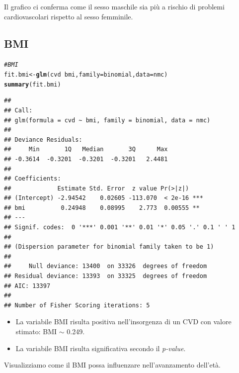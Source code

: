 \documentclass{article}\usepackage[]{graphicx}\usepackage[]{xcolor}
\makeatletter
\newcommand{\hlcom}[1]{\textcolor[rgb]{0.678,0.584,0.686}{\textit{#1}}}%
\newcommand{\hlopt}[1]{\textcolor[rgb]{0,0,0}{#1}}%
\newcommand{\hlstd}[1]{\textcolor[rgb]{0.345,0.345,0.345}{#1}}%
\newcommand{\hlkwb}[1]{\textcolor[rgb]{0.69,0.353,0.396}{#1}}%
\newcommand{\hlkwc}[1]{\textcolor[rgb]{0.333,0.667,0.333}{#1}}%
\newcommand{\hlkwd}[1]{\textcolor[rgb]{0.737,0.353,0.396}{\textbf{#1}}}%
\newenvironment{kframe}{%
 \def\at@end@of@kframe{}%
 \ifinner\ifhmode%
  \def\at@end@of@kframe{\end{minipage}}%
  \begin{minipage}{\columnwidth}%
 \fi\fi%
 \def\FrameCommand##1{\hskip\@totalleftmargin \hskip-\fboxsep
 \colorbox{shadecolor}{##1}\hskip-\fboxsep
     \hskip-\linewidth \hskip-\@totalleftmargin \hskip\columnwidth}%
 \MakeFramed {\advance\hsize-\width
   \@totalleftmargin\z@ \linewidth\hsize
   \@setminipage}}%
 {\par\unskip\endMakeFramed%
 \at@end@of@kframe}
\newenvironment{knitrout}{}{} %
\makeatother
\begin{document}
    Il grafico ci conferma come il sesso maschile sia più a rischio di problemi
    cardiovascolari rispetto al sesso femminile.
  \clearpage
  \subsection{BMI}
\begin{knitrout}
\color{fgcolor}\begin{kframe}
\begin{alltt}
\hlcom{#BMI}
\hlstd{fit.bmi} \hlkwb{<-} \hlkwd{glm}\hlstd{(cvd}\hlopt{~}\hlstd{bmi,} \hlkwc{family}\hlstd{=binomial,} \hlkwc{data}\hlstd{=nmc)}
\hlkwd{summary}\hlstd{(fit.bmi)}
\end{alltt}
\begin{verbatim}
## 
## Call:
## glm(formula = cvd ~ bmi, family = binomial, data = nmc)
## 
## Deviance Residuals: 
##     Min       1Q   Median       3Q      Max  
## -0.3614  -0.3201  -0.3201  -0.3201   2.4481  
## 
## Coefficients:
##             Estimate Std. Error  z value Pr(>|z|)    
## (Intercept) -2.94542    0.02605 -113.070  < 2e-16 ***
## bmi          0.24948    0.08995    2.773  0.00555 ** 
## ---
## Signif. codes:  0 '***' 0.001 '**' 0.01 '*' 0.05 '.' 0.1 ' ' 1
## 
## (Dispersion parameter for binomial family taken to be 1)
## 
##     Null deviance: 13400  on 33326  degrees of freedom
## Residual deviance: 13393  on 33325  degrees of freedom
## AIC: 13397
## 
## Number of Fisher Scoring iterations: 5
\end{verbatim}
\end{kframe}
\end{knitrout}
    
    \begin{itemize}
      \item La variabile BMI risulta positiva nell'insorgenza di un CVD con 
            valore stimato: BMI $\sim$ 0.249.
      \item La variabile BMI risulta significativa secondo il \emph{p-value}.
    \end{itemize}
    
    Visualizziamo come il BMI possa influenzare nell'avanzamento dell'età.
    
\end{document}
